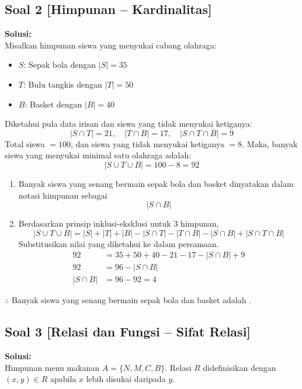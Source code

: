 \documentclass[12pt,a4paper]{article}
\begin{document}
\subsection*{Soal 2 [Himpunan -- Kardinalitas]}
\textbf{Solusi:} \\
Misalkan himpunan siswa yang menyukai cabang olahraga:
\begin{itemize}
    \item $S$: Sepak bola dengan $|S| = 35$
    \item $T$: Bulu tangkis dengan $|T| = 50$
    \item $B$: Basket dengan $|B| = 40$
\end{itemize}
Diketahui pula data irisan dan siswa yang tidak menyukai ketiganya:
\[ |S \cap T| = 21, \quad |T \cap B| = 17, \quad |S \cap T \cap B| = 9 \]
Total siswa $= 100$, dan siswa yang tidak menyukai ketiganya $= 8$. Maka, banyak siswa yang menyukai minimal satu olahraga adalah:
\[ |S \cup T \cup B| = 100 - 8 = 92 \]

\begin{enumerate}[label=(\alph*)]
    \item Banyak siswa yang senang bermain sepak bola dan basket dinyatakan dalam notasi himpunan sebagai
    \[ \boxed{|S \cap B|} \]
    
    \item Berdasarkan prinsip inklusi-eksklusi untuk 3 himpunan,
    \[ |S \cup T \cup B| = |S| + |T| + |B| - |S \cap T| - |T \cap B| - |S \cap B| + |S \cap T \cap B| \]
    Substitusikan nilai yang diketahui ke dalam persamaan.
    \begin{align*}
        92 &= 35 + 50 + 40 - 21 - 17 - |S \cap B| + 9 \\
        92 &= 96 - |S \cap B| \\
        |S \cap B| &= 96 - 92 = 4
    \end{align*}
\end{enumerate}
$\therefore$ Banyak siswa yang senang bermain sepak bola dan basket adalah .

\subsection*{Soal 3 [Relasi dan Fungsi -- Sifat Relasi]}
\textbf{Solusi:} \\
Himpunan menu makanan $A = \{N, M, C, B\}$. Relasi $R$ didefinisikan dengan $(x, y) \in R$ apabila $x$ lebih disukai daripada $y$.
\end{document}

